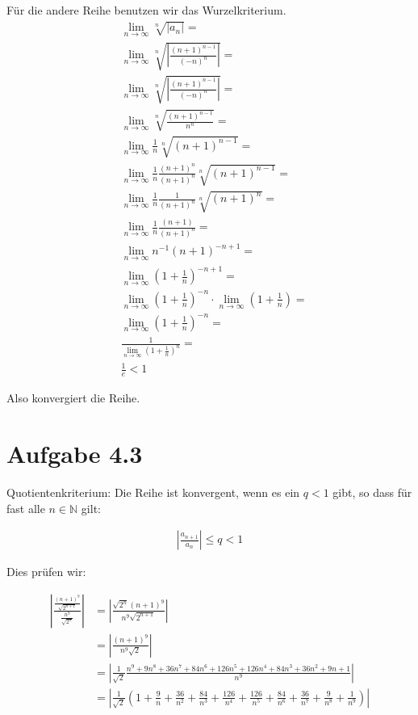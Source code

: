 \documentclass[a4paper,german,12pt,smallheadings]{scrartcl}
\begin{document}
Für die andere Reihe benutzen wir das Wurzelkriterium.
\begin{align*}
  &\lim_{n \to \infty} \sqrt[n]{\left| a_n \right|} =\\
  &\lim_{n \to \infty} \sqrt[n]{\left| \frac{(n+1)^{n-1}}{(-n)^n} \right|} =\\
  &\lim_{n \to \infty} \sqrt[n]{\left| \frac{(n+1)^{n-1}}{(-n)^n} \right|} =\\
  &\lim_{n \to \infty} \sqrt[n]{\frac{(n+1)^{n-1}}{n^n}} =\\
  &\lim_{n \to \infty} \frac{1}{n} \sqrt[n]{(n+1)^{n-1}} =\\
  &\lim_{n \to \infty} \frac{1}{n} \frac{(n+1)^n}{(n+1)^n} \sqrt[n]{(n+1)^{n-1}} =\\
  &\lim_{n \to \infty} \frac{1}{n} \frac{1}{(n+1)^n} \sqrt[n]{(n+1)^n} =\\
  &\lim_{n \to \infty} \frac{1}{n} \frac{(n+1)}{(n+1)^n} =\\
  &\lim_{n \to \infty} n^{-1} (n+1)^{-n+1} =\\
  &\lim_{n \to \infty} \left(1+\frac{1}{n}\right)^{-n+1} =\\
  &\lim_{n \to \infty} \left(1+\frac{1}{n}\right)^{-n} \cdot \lim_{n \to \infty} \left(1+\frac{1}{n}\right) =\\
  &\lim_{n \to \infty} \left(1+\frac{1}{n}\right)^{-n}=\\
  &\frac{1}{\lim_{n \to \infty} \left(1+\frac{1}{n}\right)^{n}}=\\
  &\frac{1}{e} < 1
\end{align*}

Also konvergiert die Reihe.

\section*{Aufgabe 4.3}
Quotientenkriterium: Die Reihe ist konvergent, wenn es ein $q < 1$ gibt, so
dass für fast alle $n \in \mathbb{N}$ gilt:

\begin{align*}
  \left| \frac{a_{n+1}}{a_n} \right| \le q < 1
\end{align*}

Dies prüfen wir:

\begin{align*}
  \left| \frac{\frac{(n+1)^9}{\sqrt{2^{n+1}}}}{\frac{n^9}{\sqrt{2^n}}} \right| &= \left| \frac{\sqrt{2^n} (n+1)^9}{n^9 \sqrt{2^{n+1}}} \right| \\
  &= \left| \frac{(n+1)^9}{n^9 \sqrt{2}} \right| \\
  &= \left| \frac{1}{\sqrt{2}} \frac{n^9+9n^8+36n^7+84n^6+126n^5+126n^4+84n^3+36n^2+9n+1}{n^9} \right| \\
  &= \left| \frac{1}{\sqrt{2}} \left(1 + \frac{9}{n} + \frac{36}{n^2} + \frac{84}{n^3} + \frac{126}{n^4} + \frac{126}{n^5} + \frac{84}{n^6} + \frac{36}{n^7} + \frac{9}{n^8} + \frac{1}{n^9}\right) \right| \\
\end{align*}
\end{document}
